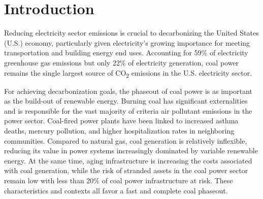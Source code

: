 \setlength{\parindent}{20pt}


\section{Introduction}


Reducing electricity sector emissions is crucial to decarbonizing the United States (U.S.) economy, particularly given electricity's growing importance for meeting transportation and building energy end uses. Accounting for 59\% of electricity greenhouse gas emissions but only 22\% of electricity generation, coal power remains the single largest source of CO\textsubscript{2} emissions in the U.S. electricity sector.

For achieving decarbonization goals, the phaseout of coal power is as important as the build-out of renewable energy.
Burning coal has significant externalities and is responsible for the vast majority of criteria air pollutant emissions in the power sector.
Coal-fired power plants have been linked to increased asthma deaths, mercury pollution, and higher hospitalization rates in neighboring communities.
Compared to natural gas, coal generation is relatively inflexible, reducing its value in power systems increasingly dominated by variable renewable energy. At the same time, aging infrastructure is increasing the costs associated with coal generation, while
the risk of stranded assets in the coal power sector remain low with less than 20\% of coal power infrastructure at risk.
These characteristics and contexts all favor a fast and complete coal phaseout. 

